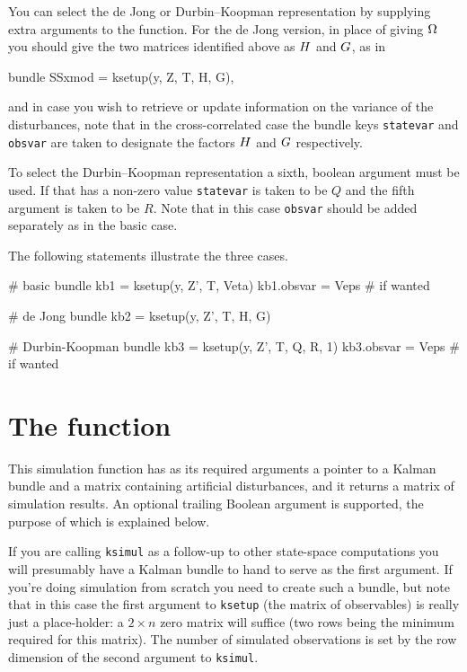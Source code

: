 You can select the de Jong or Durbin--Koopman representation by
supplying extra arguments to the  function. For the de
Jong version, in place of giving $\Omega$ you should give the two
matrices identified above as $H$ and $G$, as in
\begin{code}
bundle SSxmod = ksetup(y, Z, T, H, G),
\end{code}
and in case you wish to retrieve or update information on the variance of
the disturbances, note that in the cross-correlated case the bundle
keys \texttt{statevar} and \texttt{obsvar} are taken to designate the
factors $H$ and $G$ respectively.

To select the Durbin--Koopman representation a sixth, boolean
argument must be used. If that has a non-zero value \texttt{statevar}
is taken to be $Q$ and the fifth argument is taken to be $R$. Note
that in this case \texttt{obsvar} should be added separately as in the
basic case.

The following statements illustrate the three cases.

\begin{code}
# basic
bundle kb1 = ksetup(y, Z', T, Veta)
kb1.obsvar = Veps # if wanted

# de Jong
bundle kb2 = ksetup(y, Z', T, H, G)

# Durbin-Koopman
bundle kb3 = ksetup(y, Z', T, Q, R, 1)
kb3.obsvar = Veps # if wanted
\end{code}

\section{The  function}
\label{sec:ksimul}

This simulation function has as its required arguments a pointer to a
Kalman bundle and a matrix containing artificial disturbances, and it
returns a matrix of simulation results. An optional trailing Boolean
argument is supported, the purpose of which is explained below.

If you are calling \texttt{ksimul} as a follow-up to other state-space
computations you will presumably have a Kalman bundle to hand to serve
as the first argument. If you're doing simulation from scratch you
need to create such a bundle, but note that in this case the first
argument to \texttt{ksetup} (the matrix of observables) is really just
a place-holder: a $2 \times n$ zero matrix will suffice (two rows
being the minimum required for this matrix). The number of simulated
observations is set by the row dimension of the second argument to
\texttt{ksimul}.

